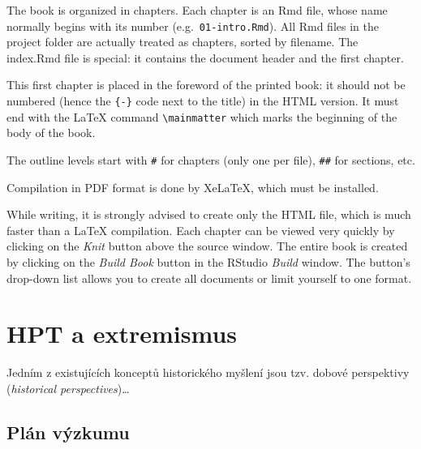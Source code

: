 \documentclass[
  12pt,
  american,
  a4paper,
  extrafontsizes,onecolumn,openright
  ]{memoir}
\makeatletter
\newcommand{\MemoirChapStyle}{daleif1}
\newcommand{\MemoirPageStyle}{Ruled}
\newlength\widthw %
\newcommand*{\SmallMargins}{
  \setlrmarginsandblock{1.5in}{1.5in}{*}
  \setmarginnotes{0.1in}{0.1in}{0.1in}
 \setulmarginsandblock{1.5in}{1in}{*}
  \checkandfixthelayout
  \ch@ngetext
  \clearpage
  \setlength{\widthw}{\textwidth+\marginparsep+\marginparwidth}
  \footnotesatfoot
  \chapterstyle{\MemoirChapStyle}  %
  \pagestyle{\MemoirPageStyle}
}
\newcommand{\LargeMargins}{\SmallMargins}
\makeatother
\begin{document}
\normalsize

The book is organized in chapters.
Each chapter is an Rmd file, whose name normally begins with its number (e.g.~\texttt{01-intro.Rmd}).
All Rmd files in the project folder are actually treated as chapters, sorted by filename.
The index.Rmd file is special: it contains the document header and the first chapter.

This first chapter is placed in the foreword of the printed book: it should not be numbered (hence the \texttt{\{-\}} code next to the title) in the HTML version.
It must end with the LaTeX command \texttt{\textbackslash{}mainmatter} which marks the beginning of the body of the book.

The outline levels start with \texttt{\#} for chapters (only one per file), \texttt{\#\#} for sections, etc.

Compilation in PDF format is done by XeLaTeX, which must be installed.

While writing, it is strongly advised to create only the HTML file, which is much faster than a LaTeX compilation.
Each chapter can be viewed very quickly by clicking on the \emph{Knit} button above the source window.
The entire book is created by clicking on the \emph{Build Book} button in the RStudio \emph{Build} window.
The button's drop-down list allows you to create all documents or limit yourself to one format.

\mainmatter

\chapter{HPT a extremismus}\label{hpt-a-extremismus}

Jedním z existujících konceptů historického myšlení jsou tzv. dobové perspektivy
(\emph{historical perspectives})\ldots{}

\section{Plán výzkumu}\label{pluxe1n-vuxfdzkumu}



\backmatter
\SmallMargins

\printbibliography
\onecolumn




\cleardoublepage
\LargeMargins
\listoffigures
\end{document}
